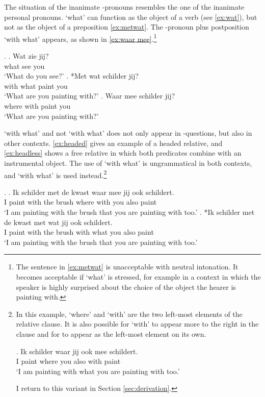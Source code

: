 \documentclass[11pt,a4paper]{article}
\begin{document}
The situation of the inanimate -pronouns resembles the one of the inanimate personal pronouns.  `what' can function as the object of a verb (see \ref{ex:wat}), but not as the object of a preposition \ref{ex:metwat}. The -pronoun plus postposition  `with what' appears, as shown in \ref{ex:waar mee}.\footnote{The sentence in \ref{ex:metwat} is unacceptable with neutral intonation. It becomes acceptable if  `what' is stressed, for example in a context in which the speaker is highly surprised about the choice of the object the hearer is painting with.}

\ex.
\ag. Wat zie jij?\\
 what see you\\
 `What do you see?'\label{ex:wat}
\bg. *Met wat schilder jij?\\
 with what paint you\\
 `What are you painting with?'\label{ex:metwat}
\bg. Waar mee schilder jij?\\
 where with paint you\\
 `What are you painting with?'\label{ex:waar mee}

 `with what' and not  `with what' does not only appear in -questions, but also in other contexts. \ref{ex:headed} gives an example of a headed relative, and \ref{ex:headless} shows a free relative in which both predicates combine with an instrumental object. The use of  `with what' is ungrammatical in both contexts, and  `with what' is used instead.\footnote{
In this example,  `where' and  `with' are the two left-most elements of the relative clause. It is also possible for  `with' to appear more to the right in the clause and for  to appear as the left-most element on its own.

\exg. Ik schilder waar jij ook mee schildert.\\
 I paint where you also with paint\\
 `I am painting with what you are painting with too.'\label{ex:meealong}

I return to this variant in Section \ref{sec:derivation}.
}


\ex.\label{ex:headed}
\ag. Ik schilder met de kwast waar mee jij ook schildert.\\
 I paint with the brush where with you also paint\\
 `I am painting with the brush that you are painting with too.'
\bg. *Ik schilder met de kwast met wat jij ook schildert.\\
 I paint with the brush with what you also paint\\
 `I am painting with the brush that you are painting with too.'
\end{document}
